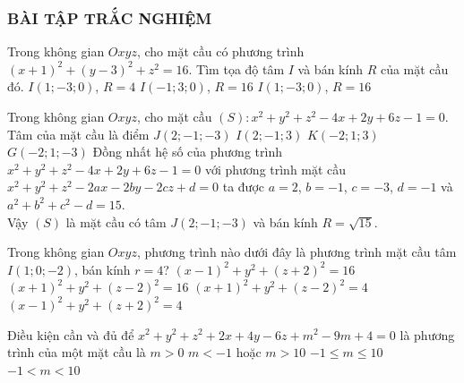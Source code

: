 \subsubsection{BÀI TẬP TRẮC NGHIỆM}
\begin{ex}%
	Trong không gian $Oxyz$, cho mặt cầu có phương trình $(x+1)^2+(y-3)^2+z^2=16$. Tìm tọa độ tâm $I$ và bán kính $R$ của mặt cầu đó.
	{$I(1;-3;0)$, $R=4$}
	{$I(-1;3;0)$, $R=16$}
	{$I(1;-3;0)$, $R=16$}
\end{ex}
\begin{ex}%
	Trong không gian $Oxyz$, cho mặt cầu $(S)\colon x^2+y^2+z^2 -4x+2y+6z-1=0$. Tâm của mặt cầu là điểm
	\choice
	{\True $J(2;-1;-3)$}
	{$I(2;-1;3)$}
	{$K(-2;1;3)$}
	{$G(-2;1;-3)$}
	\loigiai
	{
		Đồng nhất hệ số của phương trình $x^2+y^2+z^2 -4x+2y+6z-1=0$ với phương trình mặt cầu $x^2+y^2+z^2 -2ax-2by-2cz+d=0$ ta được $a=2$, $b=-1$, $c=-3$, $d=-1$ và $a^2+b^2+c^2-d=15$.\\
		Vậy $(S)$ là mặt cầu có tâm $J(2;-1;-3)$ và bán kính $R=\sqrt{15}$.
	}
\end{ex}
\begin{ex}%
	Trong không gian $Oxyz$, phương trình nào dưới đây là phương trình mặt cầu tâm	$I(1;0;-2)$, bán kính $r=4$?
	\choice
	{\True $(x-1)^2 +y^2 + (z+2)^2 =16$}
	{$(x+1)^2 +y^2 + (z-2)^2 =16$}
	{$(x+1)^2 +y^2 + (z-2)^2 =4$}
	{$(x-1)^2 +y^2 + (z+2)^2 =4$}
\end{ex}
\begin{ex}%
	Điều kiện cần và đủ để $x^2+y^2+z^2+2x+4y-6z+m^2-9m+4=0$ là phương trình của một mặt cầu là
	\choice
	{$m>0$}
	{$m<-1$ hoặc $m>10$}
	{ $-1 \le m \le 10$}
	{\True $-1<m<10$}
\end{ex}

